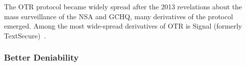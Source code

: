The \ac{OTR} protocol became widely spread after the 2013 revelations about the
mass surveillance of the \ac{NSA} and \ac{GCHQ}, many derivatives of the 
protocol emerged.
Among the most wide-spread derivatives of \ac{OTR} is Signal (formerly 
TextSecure)~\cite{SignalApp}.

\subsubsection{Better Deniability}


